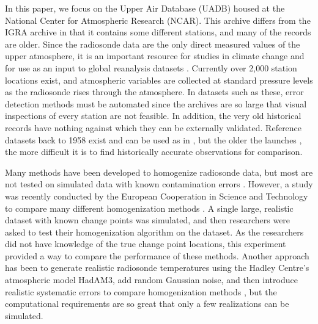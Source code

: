 \documentclass[12pt]{article}
\providecommand{\DIFaddtex}[1]{{\protect\color{blue}\uwave{#1}}} %
\providecommand{\DIFaddbegin}{} %
\providecommand{\DIFaddend}{} %
\providecommand{\DIFadd}[1]{\texorpdfstring{\DIFaddtex{#1}}{#1}} %
\begin{document}
\begin{doublespacing}
In this paper, we  focus on the Upper Air Database (UADB) housed at the National Center for Atmospheric Research (NCAR). This archive differs from the IGRA archive in that it contains some different stations, and many of the records are older. Since the radiosonde data are the only direct measured values of the upper atmosphere, it is an important resource for studies in climate change \cite{elliott91, eskridge95} and for use as an input to global reanalysis datasets \cite{kalnay96, kanamitsu02}. Currently over 2,000 station locations exist, and atmospheric variables are collected at standard pressure levels as the radiosonde rises through the atmosphere. In  datasets such as these,  error detection methods must be automated since the archives are so large that visual inspections of every station are not feasible.  In addition, the very old historical records have nothing against which they can be  externally validated.  Reference datasets back to 1958 exist and can be used as in  \cite{haimberger07, haimberger12}, but the older the launches \DIFaddbegin \DIFadd{are}\DIFaddend , the more difficult it is to find historically accurate observations for comparison.  

Many methods have been developed to homogenize radiosonde data, but most are not tested on simulated data with known contamination errors \cite{eskridge95, haimberger07, haimberger12, lanzante96, lanzante03, venema12}.  However, a study was recently conducted by the European Cooperation in Science and Technology to compare many different homogenization methods \cite{venema12}.  A single large, realistic dataset with known change points was simulated, and then researchers were asked to test their homogenization algorithm on the dataset.  As the researchers did not have knowledge of the true change point locations, this experiment provided a way to compare the performance of  these  methods.  Another approach has been to generate realistic radiosonde temperatures using the Hadley Centre's atmospheric model HadAM3, add random Gaussian noise, and then introduce realistic systematic errors to compare homogenization methods \cite{titchner09, thorne11}, but the computational requirements are so great that only a few  realizations can be simulated.


\end{doublespacing}
\end{document}
